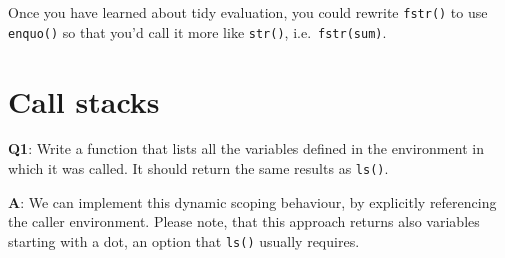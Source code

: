\documentclass[
]{krantz}
\makeatletter
\newenvironment{Shaded}{\begin{snugshade}}{\end{snugshade}}
\newcommand{\CommentTok}[1]{\textcolor[rgb]{0.56,0.35,0.01}{\textit{#1}}}
\newcommand{\ControlFlowTok}[1]{\textcolor[rgb]{0.13,0.29,0.53}{\textbf{#1}}}
\newcommand{\DataTypeTok}[1]{\textcolor[rgb]{0.13,0.29,0.53}{#1}}
\newcommand{\DecValTok}[1]{\textcolor[rgb]{0.00,0.00,0.81}{#1}}
\newcommand{\KeywordTok}[1]{\textcolor[rgb]{0.13,0.29,0.53}{\textbf{#1}}}
\newcommand{\NormalTok}[1]{#1}
\newcommand{\OtherTok}[1]{\textcolor[rgb]{0.56,0.35,0.01}{#1}}
\newcommand{\StringTok}[1]{\textcolor[rgb]{0.31,0.60,0.02}{#1}}
\newenvironment{kframe}{%
\medskip{}
\setlength{\fboxsep}{.8em}
 \def\at@end@of@kframe{}%
 \ifinner\ifhmode%
  \def\at@end@of@kframe{\end{minipage}}%
  \begin{minipage}{\columnwidth}%
 \fi\fi%
 \def\FrameCommand##1{\hskip\@totalleftmargin \hskip-\fboxsep
 \colorbox{shadecolor}{##1}\hskip-\fboxsep
     \hskip-\linewidth \hskip-\@totalleftmargin \hskip\columnwidth}%
 \MakeFramed {\advance\hsize-\width
   \@totalleftmargin\z@ \linewidth\hsize
   \@setminipage}}%
 {\par\unskip\endMakeFramed%
 \at@end@of@kframe}
\renewenvironment{Shaded}{\begin{kframe}}{\end{kframe}}
\renewcommand{\KeywordTok} [1]{\textcolor[rgb]{0.00,0.44,0.13}{{#1}}}
\renewcommand{\DataTypeTok}[1]{\textcolor[rgb]{0.56,0.13,0.00}{{#1}}}
\renewcommand{\DecValTok}  [1]{\textcolor[rgb]{0.25,0.63,0.44}{{#1}}}
\renewcommand{\StringTok}  [1]{\textcolor[rgb]{0.25,0.44,0.63}{{#1}}}
\renewcommand{\CommentTok} [1]{\textcolor[rgb]{0.38,0.63,0.69}{{#1}}}
\renewcommand{\OtherTok}   [1]{\textcolor[rgb]{0.00,0.44,0.13}{{#1}}}
\renewcommand{\NormalTok}  [1]{{#1}}
\makeatother
\begin{document}
Once you have learned about tidy evaluation, you could rewrite \texttt{fstr()} to use \texttt{enquo()} so that you'd call it more like \texttt{str()}, i.e.~\texttt{fstr(sum)}.

\hypertarget{call-stacks}{%
\section{Call stacks}\label{call-stacks}}

\textbf{{Q1}}: Write a function that lists all the variables defined in the environment in which it was called. It should return the same results as \texttt{ls()}.

\textbf{{A}}: We can implement this dynamic scoping behaviour, by explicitly referencing the caller environment. Please note, that this approach returns also variables starting with a dot, an option that \texttt{ls()} usually requires.

\begin{Shaded}
\end{Shaded}
\end{document}
